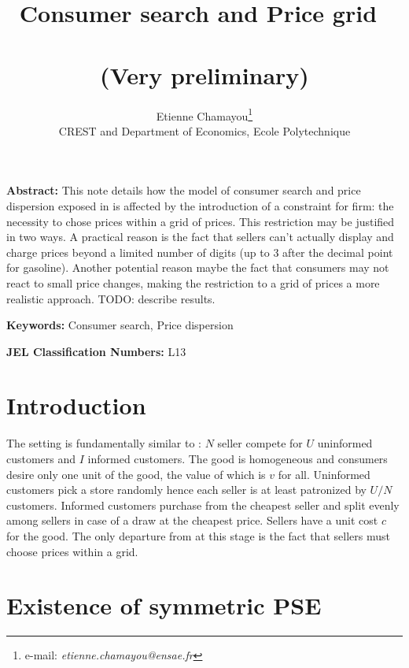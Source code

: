\documentclass[11pt]{article}
\begin{document}
\title{Consumer search and Price grid\ \\ \ \\(Very preliminary)}
\author{Etienne Chamayou\thanks{e-mail:
\textit{etienne.chamayou@ensae.fr}}\medskip\\{\normalsize CREST and Department of Economics, Ecole Polytechnique }}
\maketitle

\sloppy%

\onehalfspacing

\textbf{Abstract:}
This note details how the model of consumer search and price dispersion exposed in \cite{VAR80} is affected by the introduction of a constraint for firm: the necessity to chose prices within a grid of prices. This restriction may be justified in two ways. A practical reason is the fact that sellers can't actually display and charge prices beyond a limited number of digits (up to 3 after the decimal point for gasoline). Another potential reason maybe the fact that consumers may not react to small price changes, making the restriction to a grid of prices a more realistic approach. TODO: describe results.

\strut

\textbf{Keywords:} Consumer search, Price dispersion

\strut

\textbf{JEL Classification Numbers:} L13

\pagebreak%
\doublespacing

\section{Introduction}

The setting is fundamentally similar to \cite{VAR80}: $N$ seller compete for $U$ uninformed customers and $I$ informed customers. The good is homogeneous and consumers desire only one unit of the good, the value of which is $v$ for all. Uninformed customers pick a store randomly hence each seller is at least patronized by $U/N$ customers. Informed customers purchase from the cheapest seller and split evenly among sellers in case of a draw at the cheapest price. Sellers have a unit cost $c$ for the good. The only departure from \cite{VAR80} at this stage is the fact that sellers must choose prices within a grid.

\section{Existence of symmetric PSE}
\end{document}
